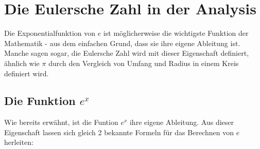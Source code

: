 \section{Die Eulersche Zahl in der Analysis} Die Exponentialfunktion von $e$ ist möglicherweise die wichtigste Funktion der Mathematik - aus dem einfachen Grund, dass sie ihre eigene Ableitung ist. Manche sagen sogar, die Eulersche Zahl wird mit dieser Eigenschaft definiert, ähnlich wie $\pi$ durch den Vergleich von Umfang und Radius in einem Kreis definiert wird.
\subsection{Die Funktion $e^x$}
Wie bereits erwähnt, ist die Funtion $e^x$ ihre eigene Ableitung. Aus dieser Eigenschaft lassen sich gleich 2 bekannte Formeln für das Berechnen von $e$ herleiten:
\newpage

